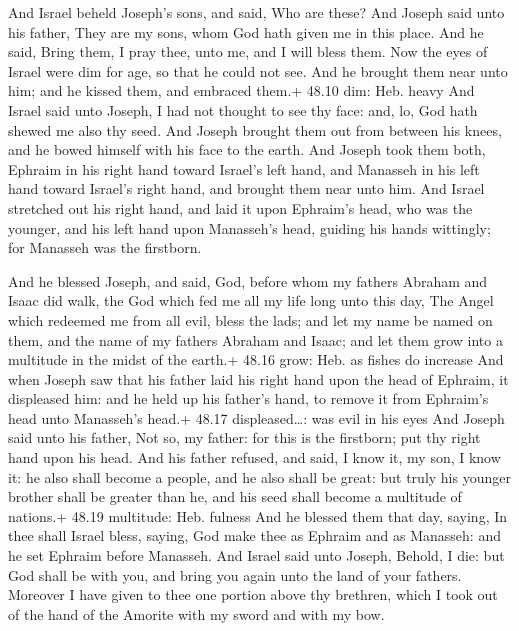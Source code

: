  And Israel beheld Joseph's sons, and said, Who are these?
 And Joseph said unto his father, They are my sons, whom God
hath given me in this place. And he said, Bring them, I pray thee, unto
me, and I will bless them.  Now the eyes of Israel were dim
for age, so that he could not see. And he brought them near unto him;
and he kissed them, and embraced them.+ 48.10 dim: Heb. heavy
 And Israel said unto Joseph, I had not thought to see thy
face: and, lo, God hath shewed me also thy seed.  And
Joseph brought them out from between his knees, and he bowed himself
with his face to the earth.  And Joseph took them both,
Ephraim in his right hand toward Israel's left hand, and Manasseh in his
left hand toward Israel's right hand, and brought them near unto him.
 And Israel stretched out his right hand, and laid it upon
Ephraim's head, who was the younger, and his left hand upon Manasseh's
head, guiding his hands wittingly; for Manasseh was the firstborn.

 And he blessed Joseph, and said, God, before whom my
fathers Abraham and Isaac did walk, the God which fed me all my life
long unto this day,  The Angel which redeemed me from all
evil, bless the lads; and let my name be named on them, and the name of
my fathers Abraham and Isaac; and let them grow into a multitude in the
midst of the earth.+ 48.16 grow: Heb. as fishes do increase
 And when Joseph saw that his father laid his right hand
upon the head of Ephraim, it displeased him: and he held up his father's
hand, to remove it from Ephraim's head unto Manasseh's head.+ 48.17
displeased\ldots: was evil in his eyes  And Joseph said
unto his father, Not so, my father: for this is the firstborn; put thy
right hand upon his head.  And his father refused, and
said, I know it, my son, I know it: he also shall become a people, and
he also shall be great: but truly his younger brother shall be greater
than he, and his seed shall become a multitude of nations.+ 48.19
multitude: Heb. fulness  And he blessed them that day,
saying, In thee shall Israel bless, saying, God make thee as Ephraim and
as Manasseh: and he set Ephraim before Manasseh.  And
Israel said unto Joseph, Behold, I die: but God shall be with you, and
bring you again unto the land of your fathers.  Moreover I
have given to thee one portion above thy brethren, which I took out of
the hand of the Amorite with my sword and with my bow.

